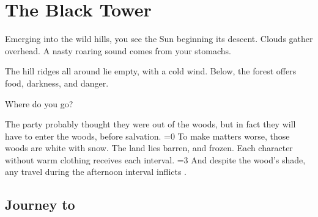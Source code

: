 \chapter{The Black Tower}
\epigraph{
  Emerging into the wild hills, you see the Sun beginning its descent.
  Clouds gather overhead.
  A nasty roaring sound comes from your stomachs.

  The hill ridges all around lie empty, with a cold wind.
  Below, the forest offers food, darkness, and danger.

  Where do you go?
}{}

\noindent
The party probably thought they were out of the woods, but in fact they will have to enter the woods, before salvation.
\ifnum\value{temperature}=0%
  To make matters worse, those woods are white with \gls{snow}.
  The land lies barren, and frozen.
  Each character without warm clothing receives  each \gls{interval}.
\else%
  \ifnum\value{temperature}=3%
  And despite the wood's shade, any travel during the afternoon \gls{interval} inflicts .
  \fi%
\fi

\section{Journey to }

